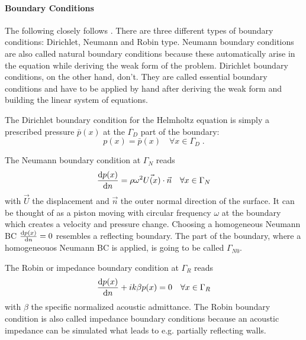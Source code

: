 \documentclass[%
  a4paper,oneside,%
  11pt,%
  smallchapters,
  style=printdev,
  extramargin,
  green,%
  rgb, <cmyk>
  ]{tubsbook}
\begin{document}
\paragraph{Boundary Conditions}
The following closely follows \cite{atalla2015}. There are three different types of boundary conditions: Dirichlet, Neumann and Robin type. Neumann boundary conditions are also called natural boundary conditions because these automatically arise in the equation while deriving the weak form of the problem. Dirichlet boundary conditions, on the other hand, don't. They are called essential boundary conditions and have to be applied by hand after deriving the weak form and building the linear system of equations.

The Dirichlet boundary condition for the Helmholtz equation is simply a prescribed pressure $\bar{p}(x)$ at the $\Gamma_D$ part of the boundary:
\begin{equation}
p(x) = \bar{p}(x) \quad \forall x \in \Gamma_D \;.
\end{equation}



	
The Neumann boundary condition at $\Gamma_N$ reads
\begin{equation}
\dv{p(x)}{n} = \rho \omega^2 \vec{U(x)} \cdot \vec{n} \quad \forall x \in \Gamma_N
\end{equation}
with $\vec{U}$ the displacement and $\vec{n}$ the outer normal direction of the surface. It can be thought of as a piston moving with circular frequency $\omega$ at the boundary which creates a velocity and pressure change. Choosing a homogeneous Neumann BC $\dv{p(x)}{n} = 0$ resembles a reflecting boundary. The part of the boundary, where a homogeneouos Neumann BC is applied, is going to be called $\Gamma_{N0}$.

The Robin or impedance boundary condition at $\Gamma_R$ reads
\begin{equation}
\dv{p(x)}{n} + ik \beta p(x) = 0 \quad \forall x \in \Gamma_R
\end{equation}
with $\beta$ the specific normalized acoustic admittance. The Robin boundary condition is also called impedance boundary conditions because an acoustic impedance can be simulated what leads to e.g. partially reflecting walls.
\end{document}
